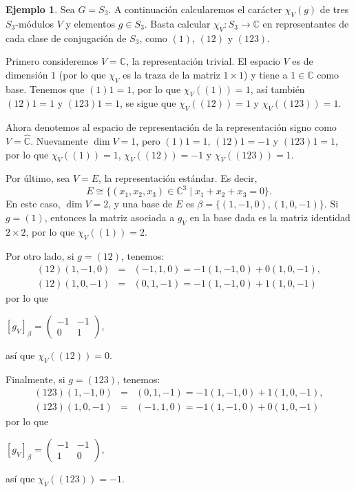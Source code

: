 \documentclass[12pt]{book}
\theoremstyle{definition}
\newtheorem{example}[theorem]{Ejemplo}
\newcounter{in}
\begin{document}
\begin{example}
  \label{caracteres-S3}
  Sea $G=S_{3}$. A continuación calcularemos el
  carácter $\chi_{V}(g)$ de tres $S_{3}$-módulos $V$ y elementos
  $g\in S_{3}$. Basta calcular $\chi_{V}:S_{3}\rightarrow\mathbb{C}$
  en representantes de cada clase de conjugación de $S_{3}$, como $(1)$,
  $(12)$ y $(123)$.
  
  Primero consideremos $V=\mathbb{C}$, la representación trivial. El
  espacio $V$ es de dimensión $1$ (por lo que $\chi_{V}$ es la traza de
  la matriz $1\times 1$) y tiene a $1\in \mathbb{C}$ como
  base. Tenemos que $(1)1=1$, por lo que $\chi_{V}((1))=1$, así también
  $(12)1=1$ y $(123)1=1$, se sigue que $\chi_{V}((12))=1$ y
  $\chi_{V}((123))=1$.

  Ahora denotemos al espacio de representación de la representación
  signo como $V=\mathbb{\hat C}$. Nuevamente
  $\dim V=1$, pero $(1)1=1$, $(12)1=-1$ y $(123)1=1$, por lo que
  $\chi_{V}((1))=1$,  $\chi_{V}((12))=-1$ y  $\chi_{V}((123))=1$.

  Por último, sea $V=E$, la representación estándar. Es decir,
  \begin{equation*}
    E\cong\{(x_{1},x_{2},x_{3})\in \mathbb{C}^{3}\mid x_{1}+x_{2}+x_{3}=0\}.
  \end{equation*}
  En este caso, $\dim V=2$, y una base de $E$ es
  $\beta=\{(1,-1,0),(1,0,-1)\}$. Si $g=(1)$, entonces la matriz
  asociada a $g_{V}$ en la base dada es la matriz identidad $2\times
  2$, por lo que $\chi_{V}((1))=2$.
  
  Por otro lado, si $g=(12)$, tenemos:
  \begin{eqnarray*}
    (12)(1,-1,0)&=&(-1,1,0)=-1(1,-1,0)+0(1,0,-1),\\
    (12)(1,0,-1)&=&(0,1,-1)=-1(1,-1,0)+1(1,0,-1)
  \end{eqnarray*} 
  por lo que 
  \begin{center}
  $[g_{V}]_{\beta}=
  \begin{pmatrix}
    -1 & -1 \\
    0 & 1 
  \end{pmatrix}$,
\end{center}
así que $\chi_{V}((12))=0$.

Finalmente, si $g=(123)$, tenemos:
\begin{eqnarray*}
  (123)(1,-1,0)&=&(0,1,-1)=-1(1,-1,0)+1(1,0,-1),\\
  (123)(1,0,-1)&=&(-1,1,0)=-1(1,-1,0)+0(1,0,-1)
\end{eqnarray*} 
por lo que 
\begin{center}
  $[g_{V}]_{\beta}=
  \begin{pmatrix}
    -1 & -1 \\
    1 & 0 
  \end{pmatrix}$,
\end{center}
así que $\chi_{V}((123))=-1$.


\end{example}
\end{document}
